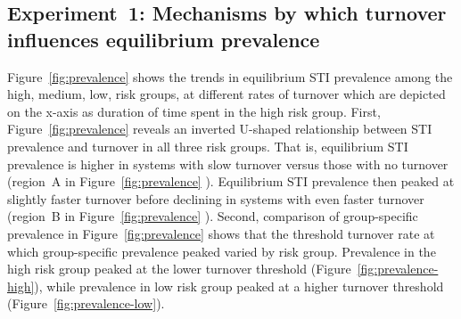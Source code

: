 \subsection{Experiment~1: Mechanisms by which turnover influences equilibrium prevalence}
\label{ss:res-prevalence}
Figure~\ref{fig:prevalence} shows the trends in equilibrium STI prevalence  			
among the high, medium, low, risk groups, at different rates of turnover which 		%
are depicted on the x-axis as
duration of time spent in the high risk group.
First, Figure~\ref{fig:prevalence} reveals an inverted U-shaped relationship
between STI prevalence and turnover in all three risk groups.
That is, equilibrium STI prevalence is higher in systems with slow turnover 
versus those with no turnover 
(region~A in Figure~\ref{fig:prevalence} ). Equilibrium STI prevalence then peaked						%
at slightly faster turnover before declining in systems with even faster turnover 
(region~B in Figure~\ref{fig:prevalence} ).
Second, comparison of group-specific prevalence in Figure~\ref{fig:prevalence} shows that
the threshold turnover rate at which group-specific prevalence peaked
varied by risk group.
Prevalence in the high risk group peaked at the lower turnover threshold
(Figure~\ref{fig:prevalence-high}),
while prevalence in low risk group peaked at a higher turnover threshold								
(Figure~\ref{fig:prevalence-low}).

